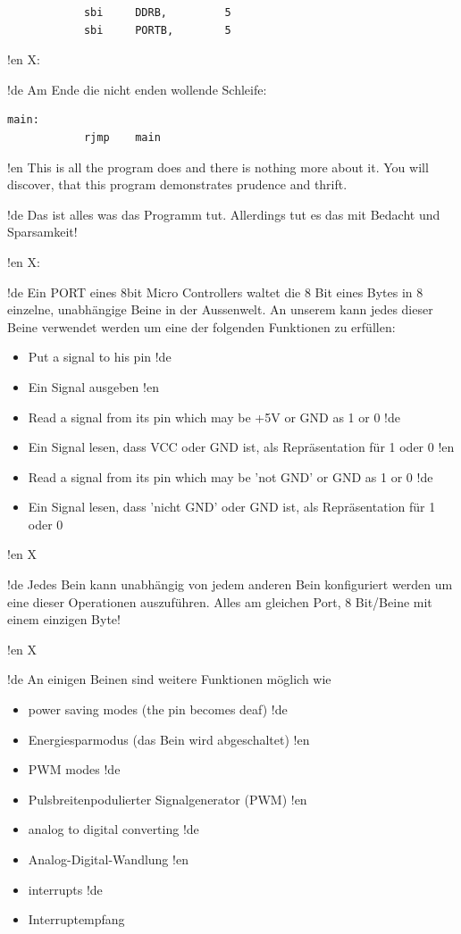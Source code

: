 \begin{lstlisting}
            sbi     DDRB,         5
            sbi     PORTB,        5
\end{lstlisting}

!en X:

!de Am Ende die nicht enden wollende Schleife:

\begin{lstlisting}
main:
            rjmp    main
\end{lstlisting}



!en This is all the program does and there is nothing more about it. You will discover, that this program demonstrates prudence and thrift. 

!de Das ist alles was das Programm tut. Allerdings tut es das mit Bedacht und Sparsamkeit!



!en X:

!de Ein PORT eines 8bit Micro Controllers waltet die 8 Bit eines Bytes in 8 einzelne, unabhängige Beine in der Aussenwelt. An unserem \at{} kann jedes dieser Beine verwendet werden um eine der folgenden Funktionen zu erfüllen:

\begin{itemize}
!en   \item Put a signal to his pin
!de   \item Ein Signal ausgeben
!en   \item Read a signal from its pin which may be +5V or GND as 1 or 0
!de   \item Ein Signal lesen, dass VCC oder GND ist, als Repräsentation für 1 oder 0
!en   \item Read a signal from its pin which may be 'not GND' or GND as 1 or 0
!de   \item Ein Signal lesen, dass 'nicht GND' oder GND ist, als Repräsentation für 1 oder 0
\end{itemize}



!en X

!de Jedes Bein kann unabhängig von jedem anderen Bein konfiguriert werden um eine dieser Operationen auszuführen. Alles am gleichen Port, 8 Bit/Beine mit einem einzigen Byte!



!en X

!de An einigen Beinen sind weitere Funktionen möglich wie

\begin{itemize}
!en   \item power saving modes (the pin becomes deaf)
!de   \item Energiesparmodus (das Bein wird abgeschaltet)
!en   \item PWM modes
!de   \item Pulsbreitenpodulierter Signalgenerator (PWM)
!en   \item analog to digital converting
!de   \item Analog-Digital-Wandlung
!en   \item interrupts
!de   \item Interruptempfang
\end{itemize}



